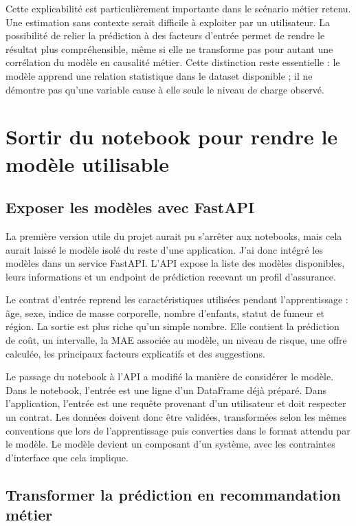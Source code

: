 Cette explicabilité est particulièrement importante dans le scénario métier retenu. Une estimation sans contexte serait difficile à exploiter par un utilisateur. La possibilité de relier la prédiction à des facteurs d'entrée permet de rendre le résultat plus compréhensible, même si elle ne transforme pas pour autant une corrélation du modèle en causalité métier. Cette distinction reste essentielle : le modèle apprend une relation statistique dans le dataset disponible ; il ne démontre pas qu'une variable cause à elle seule le niveau de charge observé.

\section{Sortir du notebook pour rendre le modèle utilisable}

\subsection{Exposer les modèles avec FastAPI}

La première version utile du projet aurait pu s'arrêter aux notebooks, mais cela aurait laissé le modèle isolé du reste d'une application. J'ai donc intégré les modèles dans un service FastAPI. L'API expose la liste des modèles disponibles, leurs informations et un endpoint de prédiction recevant un profil d'assurance.

Le contrat d'entrée reprend les caractéristiques utilisées pendant l'apprentissage : âge, sexe, indice de masse corporelle, nombre d'enfants, statut de fumeur et région. La sortie est plus riche qu'un simple nombre. Elle contient la prédiction de coût, un intervalle, la MAE associée au modèle, un niveau de risque, une offre calculée, les principaux facteurs explicatifs et des suggestions.

Le passage du notebook à l'API a modifié la manière de considérer le modèle. Dans le notebook, l'entrée est une ligne d'un DataFrame déjà préparé. Dans l'application, l'entrée est une requête provenant d'un utilisateur et doit respecter un contrat. Les données doivent donc être validées, transformées selon les mêmes conventions que lors de l'apprentissage puis converties dans le format attendu par le modèle. Le modèle devient un composant d'un système, avec les contraintes d'interface que cela implique.

\subsection{Transformer la prédiction en recommandation métier}

